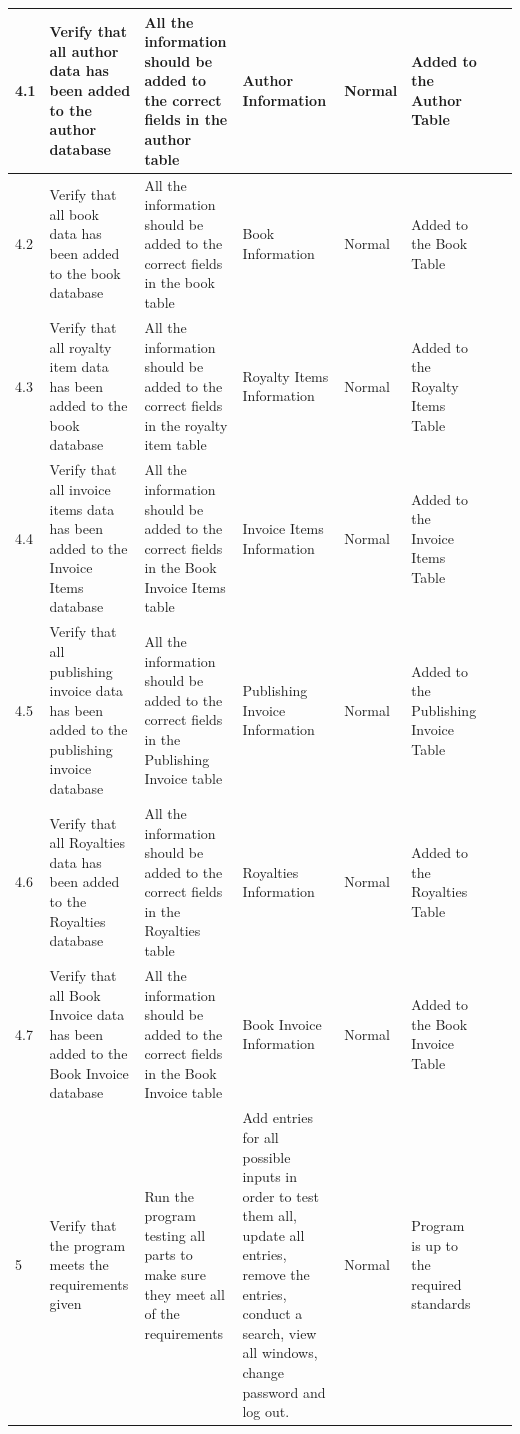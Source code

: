 \begin{landscape}
\begin{center}
\begin{longtable}{|p{1.5cm}|p{2cm}|p{2.5cm}|p{2.5cm}|p{2cm}|p{2cm}|p{2cm}|p{2cm}|}
        4.1 & Verify that all author data has been added to the author database & All the information should be added to the correct fields in the author table & Author Information & Normal & Added to the Author Table & & \\ \hline
        4.2 & Verify that all book data has been added to the book database & All the information should be added to the correct fields in the book table & Book Information & Normal & Added to the Book Table & & \\ \hline
        4.3 & Verify that all royalty item data has been added to the book database & All the information should be added to the correct fields in the royalty item table & Royalty Items Information & Normal & Added to the Royalty Items Table & & \\ \hline
        4.4 & Verify that all invoice items data has been added to the Invoice Items database & All the information should be added to the correct fields in the Book Invoice Items table & Invoice Items Information & Normal & Added to the Invoice Items Table & & \\ \hline
        4.5 & Verify that all publishing invoice data has been added to the publishing invoice database & All the information should be added to the correct fields in the Publishing Invoice table & Publishing Invoice Information & Normal & Added to the Publishing Invoice Table & & \\ \hline
        4.6 & Verify that all Royalties data has been added to the Royalties database & All the information should be added to the correct fields in the Royalties table & Royalties Information & Normal & Added to the Royalties Table & & \\ \hline
        4.7 & Verify that all Book Invoice data has been added to the Book Invoice database & All the information should be added to the correct fields in the Book Invoice table & Book Invoice Information & Normal & Added to the Book Invoice Table & & \\ \hline
        5 & Verify that the program meets the requirements given & Run the program testing all parts to make sure they meet all of the requirements & Add entries for all possible inputs in order to test them all, update all entries, remove the entries, conduct a search, view all windows, change password and log out. & Normal & Program is up to the required standards & & \\ \hline
    \end{longtable}
\end{center}






\end{landscape}
